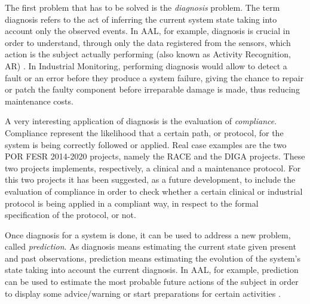 \documentclass{article}
\begin{document}
        The first problem that has to be solved is the \textit{diagnosis} problem. The term diagnosis refers to the act of inferring the current system state taking into account only the observed events. In AAL, for example, diagnosis is crucial in order to understand, through only the data registered from the sensors, which action is the subject actually performing (also known as Activity Recognition, AR) \cite{carnevali2015continuous}. In Industrial Monitoring, performing diagnosis would allow to detect a fault or an error before they produce a system failure, giving the chance to repair or patch the faulty component before irreparable damage is made, thus reducing maintenance costs.
        
        A very interesting application of diagnosis is the evaluation of \textit{compliance}. Compliance represent the likelihood that a certain path, or protocol, for the system is being correctly followed or applied. Real case examples are the two POR FESR 2014-2020 projects, namely the RACE and the DIGA projects. These two projects implements, respectively, a clinical and a maintenance protocol. For this two projects it has been suggested, as a future development, to include the evaluation of compliance in order to check whether a certain clinical or industrial protocol is being applied in a compliant way, in respect to the formal specification of the protocol, or not.
        
        Once diagnosis for a system is done, it can be used to address a new problem, called \textit{prediction}. As diagnosis means estimating the current state given present and past observations, prediction means estimating the evolution of the system's state taking into account the current diagnosis. In AAL, for example, prediction can be used to estimate the most probable future actions of the subject in order to display some advice/warning or start preparations for certain activities \cite{epew16}.
        
\end{document}
